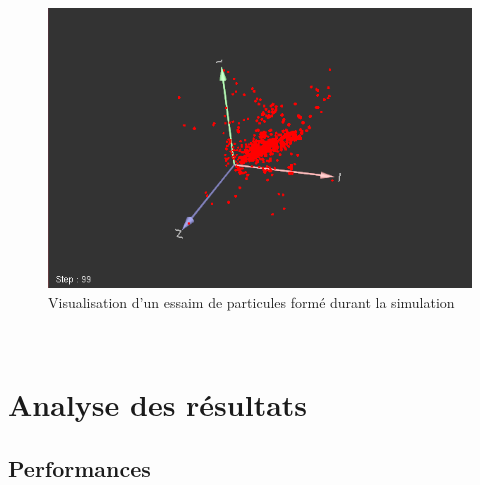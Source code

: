 \documentclass[12pt,a4paper,sans]{article}
\begin{document}
\begin{minipage}{0.33\textwidth}
	\begin{flushright}
		\begin{figure}[H]
			\centering
			\includegraphics[width=\textwidth]{img/visu.png}
			\caption{Visualisation d'un essaim de particules formé durant la simulation}
		\end{figure}
	\end{flushright}
\end{minipage}\\



\section{Analyse des résultats}

\subsection{Performances}
\end{document}

